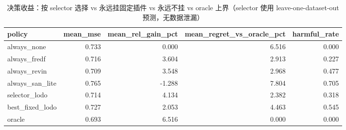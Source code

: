 \begin{table}[htbp]
\centering
\small
\caption{决策收益：按 selector 选择 vs 永远挂固定插件 vs 永远不挂 vs oracle 上界（selector 使用 leave-one-dataset-out 预测，无数据泄漏）}
\label{tab:decision_gain}
\begin{tabular}{lrrrr}
\toprule
policy & mean\_mse & mean\_rel\_gain\_pct & mean\_regret\_vs\_oracle\_pct & harmful\_rate \\
\midrule
always\_none & 0.733 & 0.000 & 6.516 & 0.000 \\
always\_fredf & 0.716 & 3.604 & 2.913 & 0.227 \\
always\_revin & 0.709 & 3.548 & 2.968 & 0.477 \\
always\_san\_lite & 0.765 & -1.288 & 7.804 & 0.705 \\
selector\_lodo & 0.714 & 4.134 & 2.382 & 0.318 \\
best\_fixed\_lodo & 0.727 & 2.053 & 4.463 & 0.545 \\
oracle & 0.693 & 6.516 & 0.000 & 0.000 \\
\bottomrule
\end{tabular}
\end{table}
